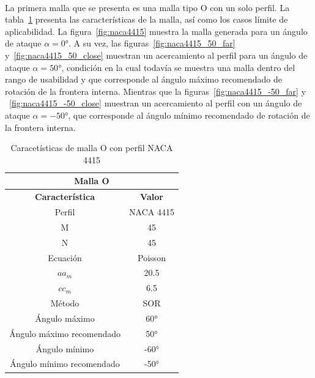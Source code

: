 \documentclass[letterpaper, openright, 12pt]{book}
\begin{document}
    \paragraph*{}
    La primera malla que se presenta es una malla tipo O con un solo perfil.
    La tabla~\ref{tabla_o_naca_4415} presenta las características de la
    malla, así como los casos límite de aplicabilidad. La
    figura~\ref{fig:naca4415} muestra la malla generada para un ángulo de
    ataque $\alpha = 0 \si{\degree}$. A su vez, las
    figuras~\ref{fig:naca4415_50_far} y~\ref{fig:naca4415_50_close}
    muestran un acercamiento al perfil para un ángulo de ataque
    $\alpha = 50\si{\degree}$, condición en la cual todavía se muestra una
    malla dentro del rango de usabilidad y que corresponde al ángulo máximo
    recomendado de rotación de la frontera interna. Mientras que la
    figuras~\ref{fig:naca4415_-50_far} y ~\ref{fig:naca4415_-50_close}
    muestran un acercamiento al perfil con un
    ángulo de ataque $\alpha = -50\si{\degree}$, que corresponde al ángulo
    mínimo recomendado de rotación de la frontera interna.
    \begin{table}[htbp!]
    \begin{center}
        \begin{tabular}{| c | c |}
        \hline
        \multicolumn{2}{|c|}{Malla O}\\

        \hline
        \textbf{Característica} & \textbf{Valor} \\ \hline

        Perfil & NACA 4415
        \\ \hline

        M & 45
        \\ \hline

        N & 45
        \\ \hline

        Ecuación & Poisson
        \\\hline

        $aa_m$ & 20.5
        \\ \hline

        $cc_m$ & 6.5
        \\ \hline

        Método & SOR
        \\\hline

        Ángulo máximo & 60\si{\degree}
        \\ \hline

        Ángulo máximo recomendado & 50\si{\degree}
        \\ \hline

        Ángulo mínimo & -60\si{\degree}
        \\ \hline

        Ángulo mínimo recomendado & -50\si{\degree}
        \\ \hline
        \end{tabular}
        \caption{Caracetísticas de malla O con perfil NACA 4415}
    \label{tabla_o_naca_4415}
    \end{center}
    \end{table}
\end{document}
